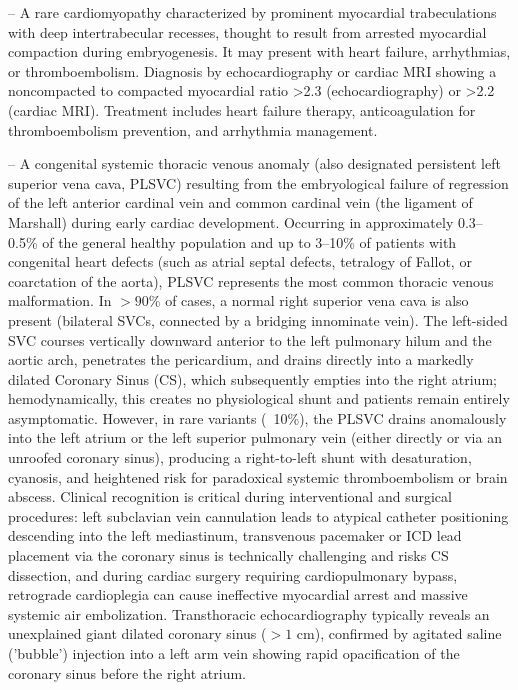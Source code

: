 -- A rare cardiomyopathy characterized by prominent myocardial trabeculations with deep intertrabecular recesses, thought to result from arrested myocardial compaction during embryogenesis. It may present with heart failure, arrhythmias, or thromboembolism. Diagnosis by echocardiography or cardiac MRI showing a noncompacted to compacted myocardial ratio >2.3 (echocardiography) or >2.2 (cardiac MRI). Treatment includes heart failure therapy, anticoagulation for thromboembolism prevention, and arrhythmia management.

-- A congenital systemic thoracic venous anomaly (also designated persistent left superior vena cava, PLSVC) resulting from the embryological failure of regression of the left anterior cardinal vein and common cardinal vein (the ligament of Marshall) during early cardiac development. Occurring in approximately 0.3--0.5\% of the general healthy population and up to 3--10\% of patients with congenital heart defects (such as atrial septal defects, tetralogy of Fallot, or coarctation of the aorta), PLSVC represents the most common thoracic venous malformation. In $>90\%$ of cases, a normal right superior vena cava is also present (bilateral SVCs, connected by a bridging innominate vein). The left-sided SVC courses vertically downward anterior to the left pulmonary hilum and the aortic arch, penetrates the pericardium, and drains directly into a markedly dilated Coronary Sinus (CS), which subsequently empties into the right atrium; hemodynamically, this creates no physiological shunt and patients remain entirely asymptomatic. However, in rare variants (~10\%), the PLSVC drains anomalously into the left atrium or the left superior pulmonary vein (either directly or via an unroofed coronary sinus), producing a right-to-left shunt with desaturation, cyanosis, and heightened risk for paradoxical systemic thromboembolism or brain abscess. Clinical recognition is critical during interventional and surgical procedures: left subclavian vein cannulation leads to atypical catheter positioning descending into the left mediastinum, transvenous pacemaker or ICD lead placement via the coronary sinus is technically challenging and risks CS dissection, and during cardiac surgery requiring cardiopulmonary bypass, retrograde cardioplegia can cause ineffective myocardial arrest and massive systemic air embolization. Transthoracic echocardiography typically reveals an unexplained giant dilated coronary sinus ($>1$ cm), confirmed by agitated saline ('bubble') injection into a left arm vein showing rapid opacification of the coronary sinus before the right atrium.

